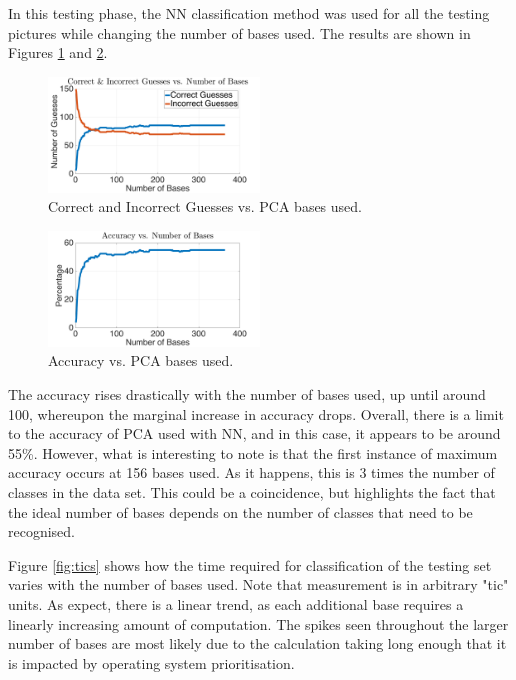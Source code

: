 \documentclass[a4paper, 10pt, conference]{ieeeconf}
\begin{document}
In this testing phase, the NN classification method was used for all the testing pictures while changing the number of bases used. The results are shown in Figures \ref{fig:correctincorrect} and \ref{fig:correctincorrectpercent}.

\begin{figure}[!ht]
    \centering
    \includegraphics[width=0.5\textwidth]{src/correctincorrect.png}
    \caption{Correct and Incorrect Guesses vs. PCA bases used.}
    \label{fig:correctincorrect}
\end{figure}

\begin{figure}[!ht]
    \centering
    \includegraphics[width=0.5\textwidth]{src/correctincorrectpercent.png}
    \caption{Accuracy vs. PCA bases used.}
    \label{fig:correctincorrectpercent}
\end{figure}

The accuracy rises drastically with the number of bases used, up until around 100, whereupon the marginal increase in accuracy drops. Overall, there is a limit to the accuracy of PCA used with NN, and in this case, it appears to be around 55\%. However, what is interesting to note is that the first instance of maximum accuracy occurs at 156 bases used. As it happens, this is 3 times the number of classes in the data set. This could be a coincidence, but highlights the fact that the ideal number of bases depends on the number of classes that need to be recognised.

Figure \ref{fig:tics} shows how the time required for classification of the testing set varies with the number of bases used. Note that measurement is in arbitrary "tic" units. As expect, there is a linear trend, as each additional base requires a linearly increasing amount of computation. The spikes seen throughout the larger number of bases are most likely due to the calculation taking long enough that it is impacted by operating system prioritisation.
\end{document}

